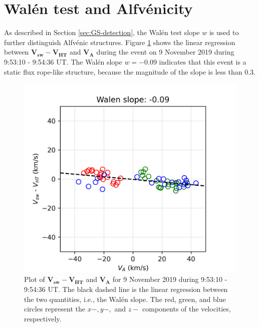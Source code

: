 \section{Wal\'en test and Alfv\'enicity}
As described in Section \ref{sec:GS-detection}, the Wal\'en test slope $w$ is used to further distinguish Alfv\'enic structures. Figure \ref{fig:walen-slope-20191109} shows the linear regression between $\mathbf{V_{sw}} - \mathbf{V_{HT}}$ and $\mathbf{V_A}$ during the event on 9 November 2019 during 9:53:10 - 9:54:36 UT. The Wal\'en slope $w=-0.09$ indicates that this event is a static flux rope-like structure, because the magnitude of the slope is less than 0.3.
\begin{figure}
    \centering
    \includegraphics[width=\textwidth]{Figures/Reconstructions/MMS1_20191109095310_20191109095436_walen_relation.png}
    \caption[Plot of Wal\'en slope for 9 November 2019 9:53:10 - 9:54:36 UT]{Plot of $\mathbf{V_{sw}} - \mathbf{V_{HT}}$ and $\mathbf{V_A}$ for 9 November 2019 during 9:53:10 - 9:54:36 UT. The black dashed line is the linear regression between the two quantities, i.e., the Wal\'en slope. The red, green, and blue circles represent the $x-,y-,$ and $z-$ components of the velocities, respectively.}
    \label{fig:walen-slope-20191109}
\end{figure}


